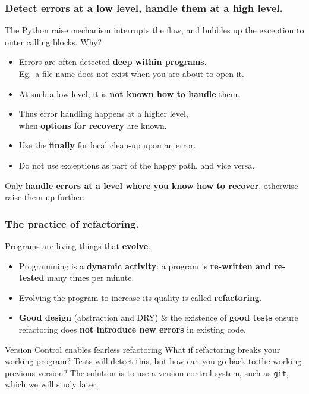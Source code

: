 \documentclass{beamer} %
\newcommand\emc[1]{\textcolor{midred}{\textbf{#1}}}
\begin{document}
\begin{frame}
\frametitle{Detect errors at a low level, handle them at a high level.}

The Python raise mechanism interrupts the flow, and bubbles up the exception to outer calling blocks. Why?
\begin{itemize}
\item Errors are often detected \emc{deep within programs}. \\ Eg.\ a file name does not exist when you are about to open it.
\item At such a low-level, it is \emc{not known how to handle} them.
\item Thus error handling happens at a higher level, \\ when \emc{options for recovery} are known.
\item Use the \emc{finally} for local clean-up upon an error.
\item Do not use exceptions as part of the happy path, and vice versa.
\end{itemize}

\vspace{3mm}
Only \emc{handle errors at a level where you know how to recover}, otherwise raise them up further.

\end{frame}


\begin{frame}
\frametitle{The practice of refactoring.}

Programs are living things that \emc{evolve}.
\begin{itemize}
\item Programming is a \emc{dynamic activity}: a program is \emc{re-written and re-tested} many times per minute.
\item Evolving the program to increase its quality is called \emc{refactoring}.
\item \emc{Good design} (abstraction and DRY) \& the existence of \emc{good tests} ensure refactoring does \emc{not introduce new errors} in existing code.
\end{itemize}

\begin{block}{Version Control enables fearless refactoring}
What if refactoring breaks your working program? Tests will detect this, but how can you go back to the working previous version? The solution is to use a version control system, such as \texttt{git}, which we will study later.
\end{block}

\end{frame}


\end{document}
